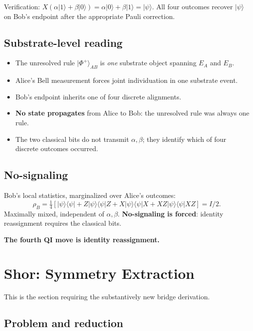 \documentclass[11pt,a4paper]{article}
\begin{document}
Verification: $X(\alpha|1\rangle + \beta|0\rangle) = \alpha|0\rangle + \beta|1\rangle = |\psi\rangle$. All four outcomes recover $|\psi\rangle$ on Bob's endpoint after the appropriate Pauli correction.

\subsection{Substrate-level reading}

\begin{itemize}[noitemsep]
  \item The unresolved rule $|\Phi^+\rangle_{AB}$ is \emph{one} substrate object spanning $E_A$ and $E_B$.
  \item Alice's Bell measurement forces joint individuation in one substrate event.
  \item Bob's endpoint inherits one of four discrete alignments.
  \item \textbf{No state propagates} from Alice to Bob: the unresolved rule was always one rule.
  \item The two classical bits do not transmit $\alpha, \beta$; they identify which of four discrete outcomes occurred.
\end{itemize}

\subsection{No-signaling}

Bob's local statistics, marginalized over Alice's outcomes:
\[
\rho_B = \tfrac{1}{4}\left[|\psi\rangle\langle\psi| + Z|\psi\rangle\langle\psi|Z + X|\psi\rangle\langle\psi|X + XZ|\psi\rangle\langle\psi|XZ\right] = I/2.
\]
Maximally mixed, independent of $\alpha, \beta$. \textbf{No-signaling is forced}: identity reassignment requires the classical bits.

\textbf{The fourth QI move is identity reassignment.}

\section{Shor: Symmetry Extraction}

This is the section requiring the substantively new bridge derivation.

\subsection{Problem and reduction}
\end{document}
